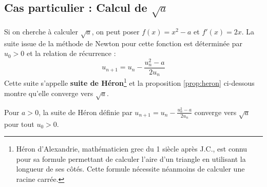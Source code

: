 \documentclass[11pt,a4paper,twoside,greek]{report}
\begin{document}
\subsection{Cas particulier : Calcul de $\sqrt{a}$}

Si on cherche à calculer $\sqrt{a}$, on peut poser $f(x)=x^2-a$ et $f'(x)=2x$. La suite issue de la méthode de Newton pour cette fonction est déterminée par $u_0>0$ et la relation de récurrence : $$u_{n+1} = u_n - \frac{u_n^2-a}{2u_n}$$
Cette suite s'appelle \textbf{suite de Héron}\footnote{Héron d'Alexandrie, mathématicien grec du 1 siècle après J.C., est connu pour sa formule permettant de calculer l'aire d'un triangle en utilisant la longueur de ses côtés. Cette formule nécessite néanmoins de calculer une racine carrée.} et la proposition \ref*{prop:heron} ci-dessous montre qu'elle converge vers $\sqrt{a}$.






\bigskip
\begin{proposition}
\label{prop:heron}
Pour $a>0$, la suite de Héron définie par $u_{n+1} = u_n - \frac{u_n^2-a}{2u_n}$
 converge vers $\sqrt{a}$ pour tout $u_0>0$.
\end{proposition}
\end{document}
